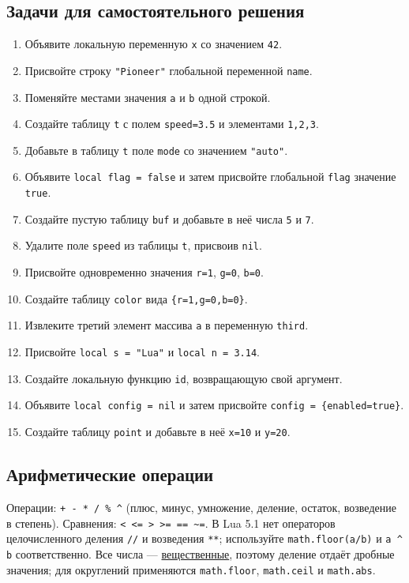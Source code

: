 \subsection*{Задачи для самостоятельного решения}
\begin{enumerate}
  \item Объявите локальную переменную \verb|x| со значением \verb|42|.
  \item Присвойте строку \verb|"Pioneer"| глобальной переменной \verb|name|.
  \item Поменяйте местами значения \verb|a| и \verb|b| одной строкой.
  \item Создайте таблицу \verb|t| с полем \verb|speed=3.5| и элементами \verb|1,2,3|.
  \item Добавьте в таблицу \verb|t| поле \verb|mode| со значением \verb|"auto"|.
  \item Объявите \verb|local flag = false| и затем присвойте глобальной \verb|flag| значение \verb|true|.
  \item Создайте пустую таблицу \verb|buf| и добавьте в неё числа \verb|5| и \verb|7|.
  \item Удалите поле \verb|speed| из таблицы \verb|t|, присвоив \verb|nil|.
  \item Присвойте одновременно значения \verb|r=1|, \verb|g=0|, \verb|b=0|.
  \item Создайте таблицу \verb|color| вида \verb|{r=1,g=0,b=0}|.
  \item Извлеките третий элемент массива \verb|a| в переменную \verb|third|.
  \item Присвойте \verb|local s = "Lua"| и \verb|local n = 3.14|.
  \item Создайте локальную функцию \verb|id|, возвращающую свой аргумент.
  \item Объявите \verb|local config = nil| и затем присвойте \verb|config = {enabled=true}|.
  \item Создайте таблицу \verb|point| и добавьте в неё \verb|x=10| и \verb|y=20|.
\end{enumerate}

\subsection{Арифметические операции}
Операции: \verb|+ - * / % ^| (плюс, минус, умножение, деление, остаток, возведение в степень). Сравнения: \verb|< <= > >= == ~=|. В Lua 5.1 нет операторов целочисленного деления \verb|//| и возведения \verb|**|; используйте \verb|math.floor(a/b)| и \verb|a ^ b| соответственно. Все числа — \hyperlink{term:number}{вещественные}, поэтому деление отдаёт дробные значения; для округлений применяются \verb|math.floor|, \verb|math.ceil| и \verb|math.abs|.

